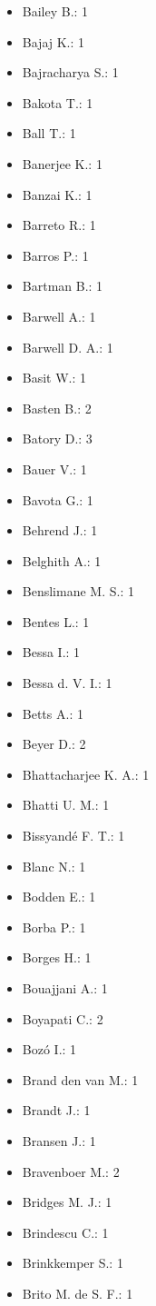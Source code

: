 \begin{itemize}
\item Bailey B.: 1
\item Bajaj K.: 1
\item Bajracharya S.: 1
\item Bakota T.: 1
\item Ball T.: 1
\item Banerjee K.: 1
\item Banzai K.: 1
\item Barreto R.: 1
\item Barros P.: 1
\item Bartman B.: 1
\item Barwell A.: 1
\item Barwell D. A.: 1
\item Basit W.: 1
\item Basten B.: 2
\item Batory D.: 3
\item Bauer V.: 1
\item Bavota G.: 1
\item Behrend J.: 1
\item Belghith A.: 1
\item Benslimane M. S.: 1
\item Bentes L.: 1
\item Bessa I.: 1
\item Bessa d. V. I.: 1
\item Betts A.: 1
\item Beyer D.: 2
\item Bhattacharjee K. A.: 1
\item Bhatti U. M.: 1
\item Bissyand{\'e} F. T.: 1
\item Blanc N.: 1
\item Bodden E.: 1
\item Borba P.: 1
\item Borges H.: 1
\item Bouajjani A.: 1
\item Boyapati C.: 2
\item Boz\'{o} I.: 1
\item Brand den van M.: 1
\item Brandt J.: 1
\item Bransen J.: 1
\item Bravenboer M.: 2
\item Bridges M. J.: 1
\item Brindescu C.: 1
\item Brinkkemper S.: 1
\item Brito M. de S. F.: 1

\end{itemize}
